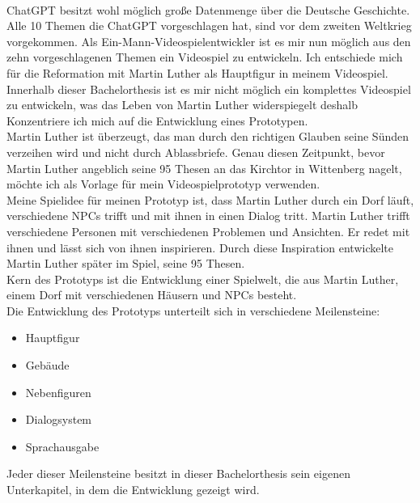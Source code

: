\\
ChatGPT besitzt wohl möglich große Datenmenge über die Deutsche Geschichte. Alle 10 Themen die ChatGPT vorgeschlagen hat, sind vor dem zweiten Weltkrieg vorgekommen. Als Ein-Mann-Videospielentwickler ist es mir nun möglich aus den zehn vorgeschlagenen Themen ein Videospiel zu entwickeln. Ich entschiede mich für die Reformation mit Martin Luther als Hauptfigur in meinem Videospiel.
\\
Innerhalb dieser Bachelorthesis ist es mir nicht möglich ein komplettes Videospiel zu entwickeln, was das Leben von Martin Luther widerspiegelt deshalb Konzentriere ich mich auf die Entwicklung eines Prototypen.
\\
Martin Luther ist überzeugt, das man durch den richtigen Glauben seine Sünden verzeihen wird und nicht durch Ablassbriefe. Genau diesen Zeitpunkt, bevor Martin Luther angeblich seine 95 Thesen an das Kirchtor in Wittenberg nagelt, möchte ich als Vorlage für mein Videospielprototyp verwenden.
\\
Meine Spielidee für meinen Prototyp ist, dass Martin Luther durch ein Dorf läuft, verschiedene NPCs trifft und mit ihnen in einen Dialog tritt. Martin Luther trifft verschiedene Personen mit verschiedenen Problemen und Ansichten. Er redet mit ihnen und lässt sich von ihnen inspirieren. Durch diese Inspiration entwickelte Martin Luther später im Spiel, seine 95 Thesen.
\\
Kern des Prototyps ist die Entwicklung einer Spielwelt, die aus Martin Luther, einem Dorf mit verschiedenen Häusern und NPCs besteht.
\\
Die Entwicklung des Prototyps unterteilt sich in verschiedene Meilensteine:
\begin{itemize}
	\item Hauptfigur
	\item Gebäude
	\item Nebenfiguren
	\item Dialogsystem
	\item Sprachausgabe
\end{itemize}
Jeder dieser Meilensteine besitzt in dieser Bachelorthesis sein eigenen Unterkapitel, in dem die Entwicklung gezeigt wird.
